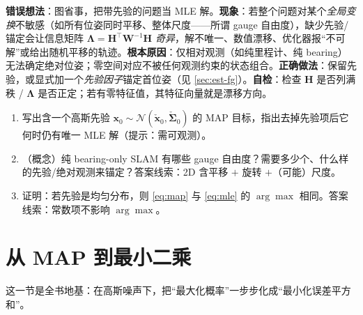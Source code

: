 \begin{pitfall}
\textbf{错误想法}：图省事，把带先验的问题当 MLE 解。\textbf{现象}：若整个问题对某个\emph{全局变换}不敏感（如所有位姿同时平移、整体尺度——所谓 gauge 自由度），缺少先验/锚定会让信息矩阵 $\boldsymbol{\Lambda}=\mathbf{H}^\top\mathbf{W}^{-1}\mathbf{H}$ \emph{奇异}，解不唯一、数值漂移、优化器报“不可解”或给出随机平移的轨迹。\textbf{根本原因}：仅相对观测（如纯里程计、纯 bearing）无法确定绝对位姿；零空间对应不被任何观测约束的状态组合。\textbf{正确做法}：保留先验，或显式加一个\emph{先验因子}锚定首位姿（见 \cref{sec:est-fg}）。\textbf{自检}：检查 $\mathbf{H}$ 是否列满秩 / $\boldsymbol{\Lambda}$ 是否正定；若有零特征值，其特征向量就是漂移方向。
\end{pitfall}

\begin{practice}
\begin{enumerate}
  \item 写出含一个高斯先验 $\mathbf{x}_0\sim\mathcal{N}(\check{\mathbf{x}}_0,\check{\boldsymbol{\Sigma}}_0)$ 的 MAP 目标，指出去掉先验项后它何时仍有唯一 MLE 解（提示：需可观测）。
  \item （概念）纯 bearing-only SLAM 有哪些 gauge 自由度？需要多少个、什么样的先验/绝对观测来锚定？答案线索：2D 含平移 $+$ 旋转 $+$（可能）尺度。
  \item 证明：若先验是均匀分布，则 \cref{eq:map} 与 \cref{eq:mle} 的 $\arg\max$ 相同。答案线索：常数项不影响 $\arg\max$。
\end{enumerate}
\end{practice}

\section{从 MAP 到最小二乘}
\label{sec:est-ls}

这一节是全书地基：在高斯噪声下，把“最大化概率”一步步化成“最小化误差平方和”。

